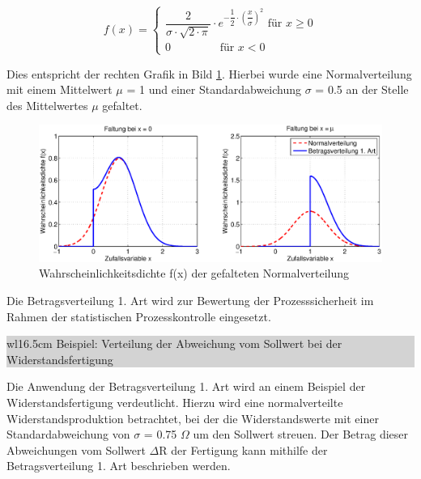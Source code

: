 \begin{equation}\label{eq:fourtwohundredtwentyseven}
f\left(x\right)=\left\{\begin{array}{c} {\dfrac{2}{\sigma \cdot \sqrt{2\cdot \pi } } \cdot e^{-\dfrac{1}{2} \cdot \left(\dfrac{x}{\sigma } \right)^{2} } \text{ für } x\ge 0} \\ 
{0 \qquad \qquad \text{ für } x<0} \end{array}\right.
\end{equation}

\noindent Dies entspricht der rechten Grafik in Bild \ref{fig:Stetig_Betragsverteilung1Art}. Hierbei wurde eine Normalverteilung mit einem Mittelwert $\mu$ = 1 und einer Standardabweichung $\sigma$ = 0.5 an der Stelle des Mittelwertes $\mu$ gefaltet.

\begin{figure}[H]
  \centerline{\includegraphics[width=1\textwidth]{Kapitel4/Bilder/image40}}
  \caption{Wahrscheinlichkeitsdichte f(x) der gefalteten Normalverteilung}
  \label{fig:Stetig_Betragsverteilung1Art}
\end{figure}

\noindent Die Betragsverteilung 1. Art wird zur Bewertung der Prozesssicherheit im Rahmen der statistischen Prozesskontrolle eingesetzt.\bigskip

\noindent
\colorbox{lightgray}{%
%
\renewcommand\arraystretch{0.6}%
\begin{tabular}{ wl{16.5cm} }
{\selectfont
\noindent
Beispiel: Verteilung der Abweichung vom Sollwert bei der Widerstandsfertigung}
\end{tabular}%
}\bigskip

\noindent Die Anwendung der Betragsverteilung 1. Art wird an einem Beispiel der Widerstandsfertigung verdeutlicht. Hierzu wird eine normalverteilte Widerstandsproduktion betrachtet, bei der die Widerstandswerte mit einer Standardabweichung von $\sigma$ = 0.75 $\Omega$ um den Sollwert streuen. Der Betrag dieser Abweichungen vom Sollwert {\textbar}$\Delta$R{\textbar} der Fertigung kann mithilfe der Betragsverteilung 1. Art beschrieben werden.\newline

